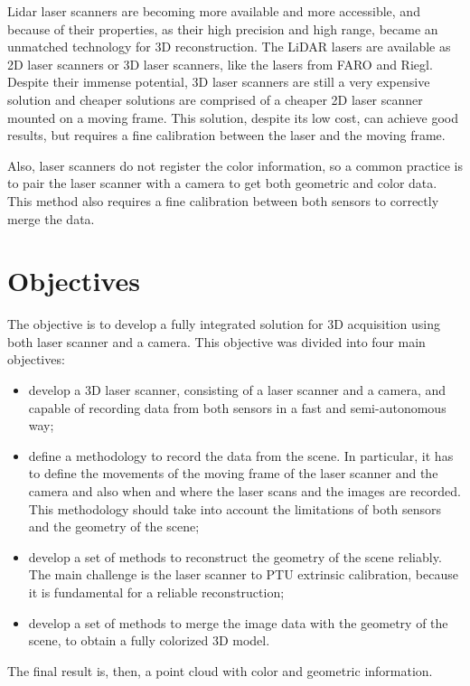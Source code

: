 Lidar laser scanners are becoming more available and more accessible,  and because of their properties, as their high precision and high range, became an unmatched technology for 3D reconstruction. The LiDAR lasers are available as 2D laser scanners or 3D laser scanners, like the lasers from FARO and Riegl. Despite their immense potential, 3D laser scanners are still a very expensive solution and cheaper solutions are comprised of a cheaper 2D laser scanner mounted on a moving frame. This solution, despite its low cost, can achieve good results, but requires a fine calibration between the laser and the moving frame. 

Also, laser scanners do not register the color information, so a common practice is to pair the laser scanner with a camera to get both geometric and color data. This method also requires a fine calibration between both sensors to correctly merge the data. 

\section{Objectives}

The objective is to develop a fully integrated solution for 3D acquisition using both laser scanner and a camera. This objective was divided into four main objectives:

\begin{itemize}
    \item develop a 3D laser scanner, consisting of a laser scanner and a camera, and capable of recording data from both sensors in a fast and semi-autonomous way;
    \item define a methodology to record the data from the scene. In particular, it has to define the movements of the moving frame of the laser scanner and the camera and also when and where the laser scans and the images are recorded. This methodology should take into account the limitations of both sensors and the geometry of the scene;
    \item develop a set of methods to reconstruct the geometry of the scene reliably. The main challenge is the laser scanner to PTU extrinsic calibration, because it is fundamental for a reliable reconstruction;
    \item develop a set of methods to merge the image data with the geometry of the scene, to obtain a fully colorized 3D model.
\end{itemize}

The final result is, then, a point cloud with color and geometric information.

